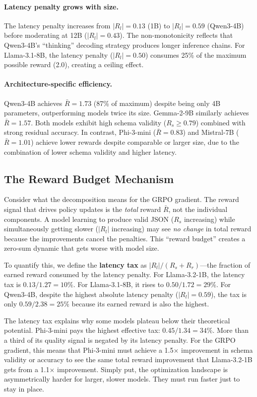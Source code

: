 \documentclass[11pt]{article}
\begin{document}
\paragraph{Latency penalty grows with size.}
The latency penalty increases from $|R_l| = 0.13$ (1B) to $|R_l| = 0.59$ (Qwen3-4B) before moderating at 12B ($|R_l| = 0.43$).  The non-monotonicity reflects that Qwen3-4B's ``thinking'' decoding strategy produces longer inference chains.  For Llama-3.1-8B, the latency penalty ($|R_l| = 0.50$) consumes 25\% of the maximum possible reward (2.0), creating a ceiling effect.

\paragraph{Architecture-specific efficiency.}
Qwen3-4B achieves $\bar{R} = 1.73$ (87\% of maximum) despite being only 4B parameters, outperforming models twice its size.  Gemma-2-9B similarly achieves $\bar{R} = 1.57$.  Both models exhibit high schema validity ($R_s \geq 0.79$) combined with strong residual accuracy.  In contrast, Phi-3-mini ($\bar{R} = 0.83$) and Mistral-7B ($\bar{R} = 1.01$) achieve lower rewards despite comparable or larger size, due to the combination of lower schema validity and higher latency.

\subsection{The Reward Budget Mechanism}

Consider what the decomposition means for the GRPO gradient.  The reward signal that drives policy updates is the \emph{total} reward $\bar{R}$, not the individual components.  A model learning to produce valid JSON ($R_s$ increasing) while simultaneously getting slower ($|R_l|$ increasing) may see \emph{no change} in total reward because the improvements cancel the penalties.  This ``reward budget'' creates a zero-sum dynamic that gets worse with model size.

To quantify this, we define the \textbf{latency tax} as $|R_l| / (R_s + R_r)$---the fraction of earned reward consumed by the latency penalty.  For Llama-3.2-1B, the latency tax is $0.13 / 1.27 = 10\%$.  For Llama-3.1-8B, it rises to $0.50 / 1.72 = 29\%$.  For Qwen3-4B, despite the highest absolute latency penalty ($|R_l| = 0.59$), the tax is only $0.59 / 2.38 = 25\%$ because its earned reward is also the highest.

The latency tax explains why some models plateau below their theoretical potential.  Phi-3-mini pays the highest effective tax: $0.45 / 1.34 = 34\%$.  More than a third of its quality signal is negated by its latency penalty.  For the GRPO gradient, this means that Phi-3-mini must achieve a 1.5$\times$ improvement in schema validity or accuracy to see the same total reward improvement that Llama-3.2-1B gets from a 1.1$\times$ improvement.  Simply put, the optimization landscape is asymmetrically harder for larger, slower models.  They must run faster just to stay in place.
\end{document}
